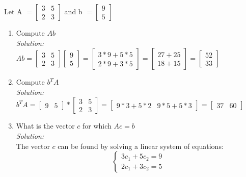 \documentclass{../amsml}
\begin{document}
\begin{problem}
Let A 
$=\begin{bmatrix}
3 & 5 \\ 
2 & 3
\end{bmatrix}$
and b $=\begin{bmatrix} 9 \\ 5 \end{bmatrix}$

\begin{enumerate}
	\item Compute $Ab$ \\
		\emph{Solution: }  \\
			$Ab = \begin{bmatrix}  3 & 5 \\ 2 & 3 \end{bmatrix} \begin{bmatrix} 9 \\ 5 \end{bmatrix} = \begin{bmatrix} 3 * 9 + 5 * 5 \\ 2 * 9 + 3 * 5 \end{bmatrix} = \begin{bmatrix} 27+ 25 \\ 18  + 15  \end{bmatrix} = \begin{bmatrix} 52 \\ 33 \end{bmatrix}$ 
			
	\item Compute $b^T A$ \\
		\emph{Solution: }  \\
			$b^TA = \begin{bmatrix} 9 & 5 \end{bmatrix} * \begin{bmatrix}  3 & 5 \\ 2 & 3 \end{bmatrix} = \begin{bmatrix} 9*3 + 5*2 & 9*5  + 5*3 \end{bmatrix} = \begin{bmatrix} 37 & 60 \end{bmatrix}$
			
	\item What is the vector $c$ for which $Ac = b$ \\
		\emph{Solution: }  \\
			The vector $c$ can be found by solving a linear system of equations: \\
			\begin{equation} \label{eq: systemOfEq}
				\begin{cases}3 c_1 + 5 c_2 = 9 \\ 2 c_1 + 3 c_2 = 5 \end{cases}
			\end{equation}
			

\end{enumerate}
\end{problem}
\end{document}
